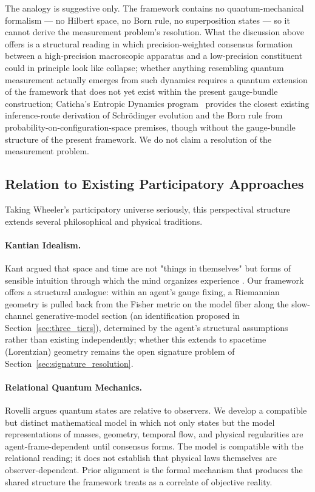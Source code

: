 \documentclass[11pt]{article}
\begin{document}
The analogy is suggestive only. The framework contains no quantum-mechanical formalism — no Hilbert space, no Born rule, no superposition states — so it cannot derive the measurement problem's resolution. What the discussion above offers is a structural reading in which precision-weighted consensus formation between a high-precision macroscopic apparatus and a low-precision constituent could in principle look like collapse; whether anything resembling quantum measurement actually emerges from such dynamics requires a quantum extension of the framework that does not yet exist within the present gauge-bundle construction; Caticha's Entropic Dynamics program~\cite{Caticha2015, Caticha2019, JohnsonCaticha2011} provides the closest existing inference-route derivation of Schr\"odinger evolution and the Born rule from probability-on-configuration-space premises, though without the gauge-bundle structure of the present framework. We do not claim a resolution of the measurement problem.

\subsection{Relation to Existing Participatory Approaches}

Taking Wheeler's participatory universe \cite{Wheeler1990} seriously,  this perspectival structure extends several philosophical and physical
traditions.

\paragraph{Kantian Idealism.} Kant argued that space and time are not "things in themselves" but forms of sensible intuition through which the mind organizes experience \cite{Kant1781}. Our framework offers a structural analogue: within an agent's gauge fixing, a Riemannian geometry is pulled back from the Fisher metric on the model fiber along the slow-channel generative-model section (an identification proposed in Section~\ref{sec:three_tiers}), determined by the agent's structural assumptions rather than existing independently; whether this extends to spacetime (Lorentzian) geometry remains the open signature problem of Section~\ref{sec:signature_resolution}.

\paragraph{Relational Quantum Mechanics.} Rovelli \cite{Rovelli1996}
argues quantum states are relative to observers. We develop a compatible but distinct mathematical model in which not only states but the model representations of masses, geometry, temporal flow, and physical regularities are agent-frame-dependent until consensus forms. The model is compatible with the relational reading; it does not establish that physical laws themselves are observer-dependent. Prior alignment is the formal mechanism that produces the shared structure the framework treats as a correlate of objective reality.
\end{document}
